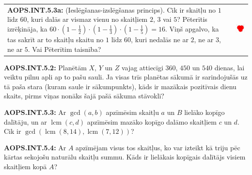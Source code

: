 \documentclass[11pt]{article}
\newenvironment{uzdevums}[1][\unskip]{%
\vspace{3mm}
\noindent
\textbf{#1:}
\noindent}
{}
\begin{document}
\begin{tabular}{@{}ll@{}} 
\begin{minipage}{0.7\columnwidth}
\begin{uzdevums}[AOPS.INT.5.3a]
(Ieslēgšanas-izslēgšanas princips). Cik ir skaitļu no $1$ līdz $60$, kuri dalās 
ar vismaz vienu no skaitļiem $2$, $3$ vai $5$? 
Pēterītis izrēķināja, ka ${\displaystyle 60 \cdot \left( 1 - \frac{1}{2} \right)
 \cdot \left( 1 - \frac{1}{3} \right) \cdot \left( 1 - \frac{1}{5} \right) = 16}$. 
Viņš apgalvo, ka tas sakrīt ar to skaitļu skaitu no 
$1$ līdz $60$, kuri nedalās ne ar $2$, ne ar $3$, ne ar $5$. Vai Pēterītim taisnība?
\end{uzdevums}
\end{minipage} &
\begin{minipage}{0.25\columnwidth}
\begin{center}
\includegraphics[width=1.5in]{test08-3a.png}
\end{center}
\end{minipage}
\end{tabular}






\begin{uzdevums}[AOPS.INT.5.2]
Planētām $X$, $Y$ un $Z$ vajag attiecīgi $360$, $450$ un $540$ dienas, lai veiktu pilnu apli ap to pašu 
sauli. Ja visas trīs planētas sākumā ir sarindojušās uz tā paša stara (kuram saule ir sākumpunkts), 
kāds ir mazākais pozitīvais dienu skaits, pirms viņas nonāks šajā pašā sākuma stāvoklī? 
\end{uzdevums}


\begin{uzdevums}[AOPS.INT.5.3]
Ar $\gcd(a, b)$ apzīmēsim skaitļu $a$ un $B$ lielāko kopīgo dalītāju, un 
ar $\operatorname{lcm}(c,d)$ apzīmēsim mazāko kopīgo dalāmo skaitļiem $c$ un $d$. 
Cik ir $\gcd(\operatorname{lcm}(8,14),\operatorname{lcm}(7,12))$?
\end{uzdevums}


\begin{uzdevums}[AOPS.INT.5.4]
Ar $A$ apzīmējam visus tos skaitļus, ko var izteikt kā triju pēc kārtas sekojošu naturālu skaitļu summu. 
Kāds ir lielākais kopīgais dalītājs visiem skaitļiem kopā $A$? 
\end{uzdevums}
\end{document}
